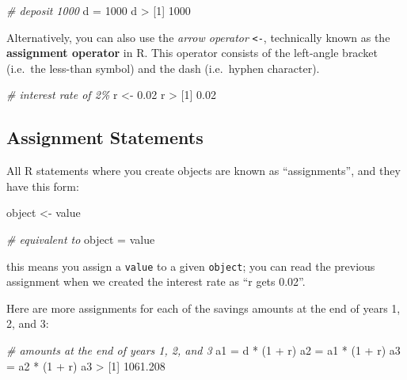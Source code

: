 \documentclass[
]{book}
\newenvironment{Shaded}{\begin{snugshade}}{\end{snugshade}}
\newcommand{\CommentTok}[1]{\textcolor[rgb]{0.56,0.35,0.01}{\textit{#1}}}
\newcommand{\DecValTok}[1]{\textcolor[rgb]{0.00,0.00,0.81}{#1}}
\newcommand{\FloatTok}[1]{\textcolor[rgb]{0.00,0.00,0.81}{#1}}
\newcommand{\NormalTok}[1]{#1}
\newcommand{\OtherTok}[1]{\textcolor[rgb]{0.56,0.35,0.01}{#1}}
\newcommand{\SpecialCharTok}[1]{\textcolor[rgb]{0.00,0.00,0.00}{#1}}
\begin{document}
\begin{Shaded}
\begin{Highlighting}[]
\CommentTok{\# deposit 1000}
\NormalTok{d }\OtherTok{=} \DecValTok{1000}
\NormalTok{d}
\SpecialCharTok{\textgreater{}}\NormalTok{ [}\DecValTok{1}\NormalTok{] }\DecValTok{1000}
\end{Highlighting}
\end{Shaded}

Alternatively, you can also use the \emph{arrow operator} \texttt{\textless{}-}, technically known as
the \textbf{assignment operator} in R. This operator consists of the left-angle
bracket (i.e.~the less-than symbol) and the dash (i.e.~hyphen character).

\begin{Shaded}
\begin{Highlighting}[]
\CommentTok{\# interest rate of 2\%}
\NormalTok{r }\OtherTok{\textless{}{-}} \FloatTok{0.02}
\NormalTok{r}
\SpecialCharTok{\textgreater{}}\NormalTok{ [}\DecValTok{1}\NormalTok{] }\FloatTok{0.02}
\end{Highlighting}
\end{Shaded}

\hypertarget{assignment-statements}{%
\subsection{Assignment Statements}\label{assignment-statements}}

All R statements where you create objects are known as ``assignments'', and they
have this form:

\begin{Shaded}
\begin{Highlighting}[]
\NormalTok{object }\OtherTok{\textless{}{-}}\NormalTok{ value}

\CommentTok{\# equivalent to}
\NormalTok{object }\OtherTok{=}\NormalTok{ value}
\end{Highlighting}
\end{Shaded}

this means you assign a \texttt{value} to a given \texttt{object};
you can read the previous assignment when we created the interest rate as
``r gets 0.02''.

Here are more assignments for each of the savings amounts at the end of years
1, 2, and 3:

\begin{Shaded}
\begin{Highlighting}[]
\CommentTok{\# amounts at the end of years 1, 2, and 3}
\NormalTok{a1 }\OtherTok{=}\NormalTok{ d }\SpecialCharTok{*}\NormalTok{ (}\DecValTok{1} \SpecialCharTok{+}\NormalTok{ r)}
\NormalTok{a2 }\OtherTok{=}\NormalTok{ a1 }\SpecialCharTok{*}\NormalTok{ (}\DecValTok{1} \SpecialCharTok{+}\NormalTok{ r)}
\NormalTok{a3 }\OtherTok{=}\NormalTok{ a2 }\SpecialCharTok{*}\NormalTok{ (}\DecValTok{1} \SpecialCharTok{+}\NormalTok{ r)}
\NormalTok{a3}
\SpecialCharTok{\textgreater{}}\NormalTok{ [}\DecValTok{1}\NormalTok{] }\FloatTok{1061.208}
\end{Highlighting}
\end{Shaded}
\end{document}
